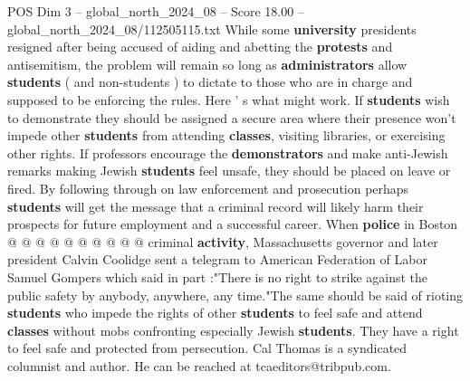 \begin{textsample}{POS Dim 3 – global\_north\_2024\_08 – Score 18.00 – global\_north\_2024\_08/112505115.txt}
While some \textbf{university} presidents resigned after being accused of aiding and abetting the \textbf{protests} and antisemitism, the problem will remain so long as \textbf{administrators} allow \textbf{students} ( and non-students ) to dictate to those who are in charge and supposed to be enforcing the rules.
Here ' s what might work.
If \textbf{students} wish to demonstrate they should be assigned a secure area where their presence won't impede other \textbf{students} from attending \textbf{classes}, visiting libraries, or exercising other rights.
If professors encourage the \textbf{demonstrators} and make anti-Jewish remarks making Jewish \textbf{students} feel unsafe, they should be placed on leave or fired.
By following through on law enforcement and prosecution perhaps \textbf{students} will get the message that a criminal record will likely harm their prospects for future employment and a successful career.
When \textbf{police} in Boston @ @ @ @ @ @ @ @ @ @ criminal \textbf{activity}, Massachusetts governor and later president Calvin Coolidge sent a telegram to American Federation of Labor Samuel Gompers which said in part :"There is no right to strike against the public safety by anybody, anywhere, any time."The same should be said of rioting \textbf{students} who impede the rights of other \textbf{students} to feel safe and attend \textbf{classes} without mobs confronting especially Jewish \textbf{students}.
They have a right to feel safe and protected from persecution.
Cal Thomas is a syndicated columnist and author.
He can be reached at tcaeditors@tribpub.com.

\end{textsample}
